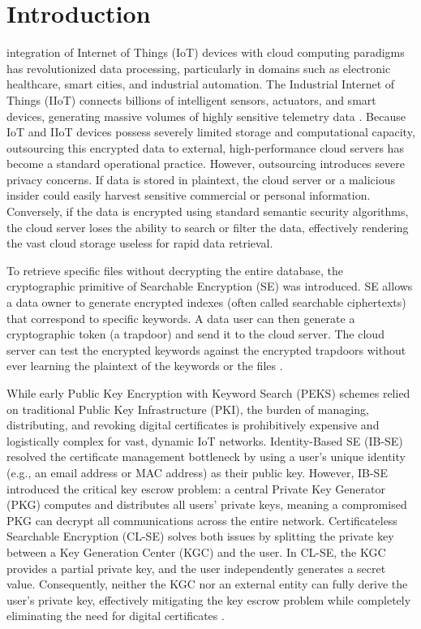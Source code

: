 \documentclass[10pt,journal,compsoc]{IEEEtran}
\begin{document}
\section{Introduction}\label{sec:intro}

 integration of Internet of Things (IoT) devices with cloud computing paradigms has revolutionized data processing, particularly in domains such as electronic healthcare, smart cities, and industrial automation. The Industrial Internet of Things (IIoT) connects billions of intelligent sensors, actuators, and smart devices, generating massive volumes of highly sensitive telemetry data \cite{liu2023pairing}. Because IoT and IIoT devices possess severely limited storage and computational capacity, outsourcing this encrypted data to external, high-performance cloud servers has become a standard operational practice. However, outsourcing introduces severe privacy concerns. If data is stored in plaintext, the cloud server or a malicious insider could easily harvest sensitive commercial or personal information. Conversely, if the data is encrypted using standard semantic security algorithms, the cloud server loses the ability to search or filter the data, effectively rendering the vast cloud storage useless for rapid data retrieval.

To retrieve specific files without decrypting the entire database, the cryptographic primitive of Searchable Encryption (SE) was introduced. SE allows a data owner to generate encrypted indexes (often called searchable ciphertexts) that correspond to specific keywords. A data user can then generate a cryptographic token (a trapdoor) and send it to the cloud server. The cloud server can test the encrypted keywords against the encrypted trapdoors without ever learning the plaintext of the keywords or the files \cite{elhabob2020efficient}. 

While early Public Key Encryption with Keyword Search (PEKS) schemes relied on traditional Public Key Infrastructure (PKI), the burden of managing, distributing, and revoking digital certificates is prohibitively expensive and logistically complex for vast, dynamic IoT networks. Identity-Based SE (IB-SE) resolved the certificate management bottleneck by using a user's unique identity (e.g., an email address or MAC address) as their public key. However, IB-SE introduced the critical key escrow problem: a central Private Key Generator (PKG) computes and distributes all users' private keys, meaning a compromised PKG can decrypt all communications across the entire network. Certificateless Searchable Encryption (CL-SE) solves both issues by splitting the private key between a Key Generation Center (KGC) and the user. In CL-SE, the KGC provides a partial private key, and the user independently generates a secret value. Consequently, neither the KGC nor an external entity can fully derive the user's private key, effectively mitigating the key escrow problem while completely eliminating the need for digital certificates \cite{lu2023certificateless}.
\end{document}
